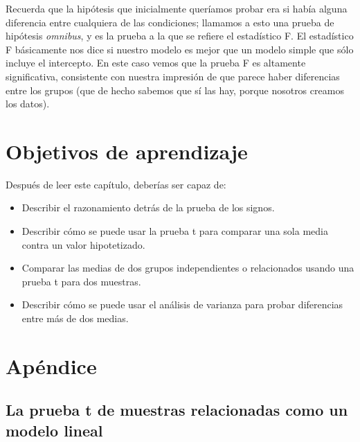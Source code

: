 \documentclass[
  12pt,
]{book}
\providecommand{\tightlist}{%
  \setlength{\itemsep}{0pt}\setlength{\parskip}{0pt}}
\begin{document}
Recuerda que la hipótesis que inicialmente queríamos probar era si había alguna diferencia entre cualquiera de las condiciones; llamamos a esto una prueba de hipótesis \emph{omnibus}, y es la prueba a la que se refiere el estadístico F. El estadístico F básicamente nos dice si nuestro modelo es mejor que un modelo simple que sólo incluye el intercepto. En este caso vemos que la prueba F es altamente significativa, consistente con nuestra impresión de que parece haber diferencias entre los grupos (que de hecho sabemos que sí las hay, porque nosotros creamos los datos).

\hypertarget{objetivos-de-aprendizaje-14}{%
\section{Objetivos de aprendizaje}\label{objetivos-de-aprendizaje-14}}

Después de leer este capítulo, deberías ser capaz de:

\begin{itemize}
\tightlist
\item
  Describir el razonamiento detrás de la prueba de los signos.
\item
  Describir cómo se puede usar la prueba t para comparar una sola media contra un valor hipotetizado.
\item
  Comparar las medias de dos grupos independientes o relacionados usando una prueba t para dos muestras.
\item
  Describir cómo se puede usar el análisis de varianza para probar diferencias entre más de dos medias.
\end{itemize}

\hypertarget{apuxe9ndice-6}{%
\section{Apéndice}\label{apuxe9ndice-6}}

\hypertarget{la-prueba-t-de-muestras-relacionadas-como-un-modelo-lineal}{%
\subsection{La prueba t de muestras relacionadas como un modelo lineal}\label{la-prueba-t-de-muestras-relacionadas-como-un-modelo-lineal}}
\end{document}
